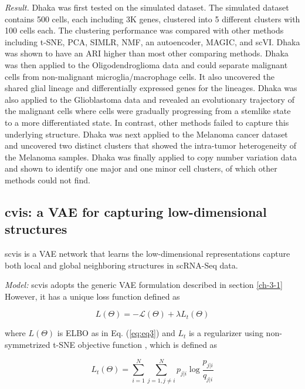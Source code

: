 \documentclass[
]{book}
\begin{document}
\emph{Result.} Dhaka was first tested on the simulated dataset. The simulated dataset contains 500 cells, each including 3K genes, clustered into 5 different clusters with 100 cells each. The clustering performance was compared with other methods including t-SNE, PCA, SIMLR, NMF, an autoencoder, MAGIC, and scVI. Dhaka was shown to have an ARI higher than most other comparing methods. Dhaka was then applied to the Oligodendroglioma data and could separate malignant cells from non-malignant microglia/macrophage cells. It also uncovered the shared glial lineage and differentially expressed genes for the lineages. Dhaka was also applied to the Glioblastoma data and revealed an evolutionary trajectory of the malignant cells where cells were gradually progressing from a stemlike state to a more differentiated state. In contrast, other methods failed to capture this underlying structure. Dhaka was next applied to the Melanoma cancer dataset \citep{RN188} and uncovered two distinct clusters that showed the intra-tumor heterogeneity of the Melanoma samples. Dhaka was finally applied to copy number variation data \citep{RN189} and shown to identify one major and one minor cell clusters, of which other methods could not find.

\hypertarget{ch-5-3-3}{%
\subsection{cvis: a VAE for capturing low-dimensional structures}\label{ch-5-3-3}}

scvis \citep{RN127} is a VAE network that learns the low-dimensional representations capture both local and global neighboring structures in scRNA-Seq data.

\emph{Model:} scvis adopts the generic VAE formulation described in section \ref{ch-3-1} However, it has a unique loss function defined as

\begin{equation}
L(\Theta)= - \mathcal{L}(\Theta) + \lambda L_{t}(\Theta) \label{eq:eq26}
\end{equation}

where \(L(\Theta)\) is ELBO as in Eq. (\eqref{eq:eq3}) and \(L_{t}\) is a regularizer using non-symmetrized t-SNE objective function \citep{RN127}, which is defined as

\begin{equation}
L_{t}(\Theta)= \sum_{i=1}^{N}\sum_{j=1,j\neq i}^{N} p_{j\vert i}\log{\frac{p_{j \vert i}}{q_{j \vert i}} } \label{eq:eq27}
\end{equation}
\end{document}
